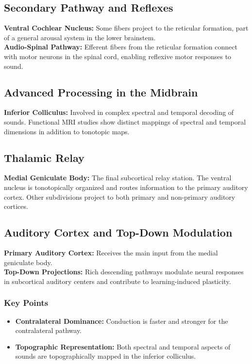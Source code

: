 \documentclass{article}
\begin{document}
\subsection{Secondary Pathway and Reflexes}
\textbf{Ventral Cochlear Nucleus:} Some fibers project to the reticular formation, part of a general arousal system in the lower brainstem. \\
\textbf{Audio-Spinal Pathway:} Efferent fibers from the reticular formation connect with motor neurons in the spinal cord, enabling reflexive motor responses to sound.

\subsection{Advanced Processing in the Midbrain}
\textbf{Inferior Colliculus:} Involved in complex spectral and temporal decoding of sounds. Functional MRI studies show distinct mappings of spectral and temporal dimensions in addition to tonotopic maps.

\subsection{Thalamic Relay}
\textbf{Medial Geniculate Body:} The final subcortical relay station. The ventral nucleus is tonotopically organized and routes information to the primary auditory cortex. Other subdivisions project to both primary and non-primary auditory cortices.
\subsection{Auditory Cortex and Top-Down Modulation}
\textbf{Primary Auditory Cortex:} Receives the main input from the medial geniculate body. \\
\textbf{Top-Down Projections:} Rich descending pathways modulate neural responses in subcortical auditory centers and contribute to learning-induced plasticity.

\subsubsection{Key Points}
\begin{itemize}
    \item \textbf{Contralateral Dominance:} Conduction is faster and stronger for the contralateral pathway.
    \item \textbf{Topographic Representation:} Both spectral and temporal aspects of sounds are topographically mapped in the inferior colliculus.
\end{itemize}
\end{document}
